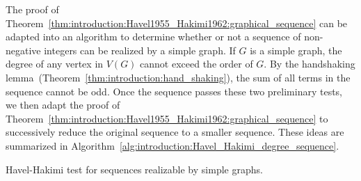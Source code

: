 The proof of
Theorem~\ref{thm:introduction:Havel1955_Hakimi1962:graphical_sequence}
can be adapted into an algorithm to determine whether or not a
sequence of non-negative integers can be realized by a simple
graph. If $G$ is a simple graph, the degree of any vertex in $V(G)$
cannot exceed the order of $G$. By the handshaking
lemma~(Theorem~\ref{thm:introduction:hand_shaking}), the sum of all
terms in the sequence cannot be odd. Once the sequence passes these
two preliminary tests, we then adapt the proof of
Theorem~\ref{thm:introduction:Havel1955_Hakimi1962:graphical_sequence}
to successively reduce the original sequence to a smaller
sequence. These ideas are summarized in
Algorithm~\ref{alg:introduction:Havel_Hakimi_degree_sequence}.

\begin{algorithm}[!htpb]
\dontprintsemicolon  %
\BlankLine
{}
\caption{Havel-Hakimi test for sequences realizable by simple graphs.}
\label{alg:introduction:Havel_Hakimi_degree_sequence}
\end{algorithm}

